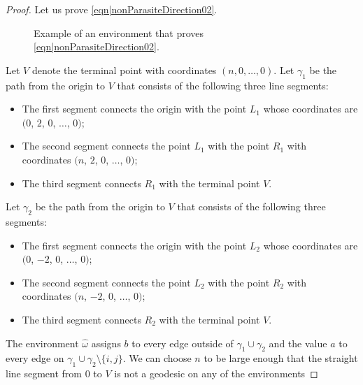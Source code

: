 \documentclass[reqno]{amsart}
\begin{document}
\begin{proof}
Let us prove \eqref{eqn|nonParasiteDirection02}. 
 \begin{figure}[t]
 \centering
{}
\caption{Example of an environment that proves \eqref{eqn|nonParasiteDirection02}.}
 \label{fig|nonParasiteDirection02}
\end{figure}
Let $V$ denote the terminal point with coordinates $(n,0,\dots, 0)$.  
Let $\gamma_1$ be the path from the origin to $V$ that consists of the following three line segments:
\begin{itemize}
\item The first segment connects the origin with the point $L_1$ whose coordinates are $(0$, $2$, $0$, $\dots$, $0)$;
\item The second segment connects the point $L_1$ with the point $R_1$ with coordinates $(n$, $2$, $0$, $\dots$, $0)$;
\item The third segment connects $R_1$ with the terminal point $V$. 
\end{itemize} 
Let $\gamma_2$ be the path from the origin to $V$ that consists of the following three segments:
\begin{itemize} 
\item The first segment connects the origin with the point $L_2$ whose coordinates are $(0$, $-2$, $0$, $\dots$, $0)$;
\item The second segment connects the point $L_2$ with the point $R_2$ with coordinates $(n$, $-2$, $0$, $\dots$, $0)$;
\item The third segment connects $R_2$ with the terminal point $V$. 
\end{itemize}
The environment $\hat\omega$ assigns $b$ to every edge outside of $\gamma_1\cup \gamma_2$ and the value $a$ to every edge on 
$\gamma_1\cup \gamma_2\setminus\{i,j\}$. 
We can choose $n$ to be large enough that the straight line segment from $0$ to $V$ is not a geodesic on any of the environments 

\end{proof}
\end{document}
